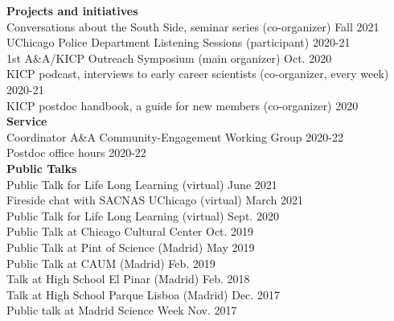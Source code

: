 \documentclass[11pt,a4paper]{article}
\newcommand{\contsizelong}{0.95\linewidth}
\begin{document}
\begin{minipage}[t]{\contsizelong}
\begin{flushleft}
\textbf{Projects and initiatives} \\
Conversations about the South Side, seminar series (co-organizer) \hfill Fall 2021\\
UChicago Police Department Listening Sessions (participant) \hfill 2020-21\\
1st A\&A/KICP Outreach Symposium (main organizer) \hfill Oct. 2020 \\
KICP podcast, interviews to early career scientists (co-organizer, every week) \hfill 2020-21 \\
KICP postdoc handbook, a guide for new members (co-organizer) \hfill 2020 \\
\vspace{5pt}
\textbf{Service} \\
Coordinator A\&A Community-Engagement Working Group  \hfill 2020-22\\
Postdoc office hours  \hfill 2020-22 \\

\vspace{5pt}
\textbf{Public Talks} \\
Public Talk for Life Long Learning (virtual) \hfill June 2021\\
%
Fireside chat with SACNAS UChicago (virtual) \hfill March 2021 \\ 
Public Talk for Life Long Learning (virtual) \hfill Sept. 2020\\
Public Talk at Chicago Cultural Center \hfill Oct. 2019 \\
Public Talk at Pint of Science (Madrid) \hfill May 2019 \\
Public Talk at CAUM (Madrid) \hfill Feb. 2019 \\
Talk at High School El Pinar (Madrid) \hfill Feb. 2018 \\
Talk at High School Parque Lisboa (Madrid) \hfill Dec. 2017 \\
Public talk at Madrid Science Week \hfill Nov. 2017


\end{flushleft}
\end{minipage}
\end{document}
